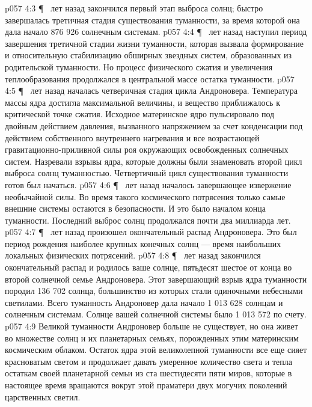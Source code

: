 \vs p057 4:3 \P\  лет назад закончился первый этап выброса солнц; быстро завершалась третичная стадия существования туманности, за время которой она дала начало 876 926 солнечным системам.
\vs p057 4:4 \P\  лет назад наступил период завершения третичной стадии жизни туманности, которая вызвала формирование и относительную стабилизацию обширных звездных систем, образованных из родительской туманности. Но процесс физического сжатия и увеличения теплообразования продолжался в центральной массе остатка туманности.
\vs p057 4:5 \P\  лет назад началась четверичная стадия цикла Андроновера. Температура массы ядра достигла максимальной величины, и вещество приближалось к критической точке сжатия. Исходное материнское ядро пульсировало под двойным действием давления, вызванного напряжением за счет конденсации под действием собственного внутреннего нагревания и все возрастающей гравитационно\hyp{}приливной силы роя окружающих освобожденных солнечных систем. Назревали взрывы ядра, которые должны были знаменовать второй цикл выброса солнц туманностью. Четвертичный цикл существования туманности готов был начаться.
\vs p057 4:6 \P\  лет назад началось завершающее извержение необычайной силы. Во время такого космического потрясения только самые внешние системы остаются в безопасности. И это было началом конца туманности. Последний выброс солнц продолжался почти два миллиарда лет.
\vs p057 4:7 \P\  лет назад произошел окончательный распад Андроновера. Это был период рождения наиболее крупных конечных солнц --- время наибольших локальных физических потрясений.
\vs p057 4:8 \P\  лет назад закончился окончательный распад и родилось ваше солнце, пятьдесят шестое от конца во второй солнечной семье Андроновера. Этот завершающий взрыв ядра туманности породил 136 702 солнца, большинство из которых стали одиночными небесными светилами. Всего туманность Андроновер дала начало 1 013 628 солнцам и солнечным системам. Солнце вашей солнечной системы было 1 013 572 по счету.
\vs p057 4:9 Великой туманности Андроновер больше не существует, но она живет во множестве солнц и их планетарных семьях, порожденных этим материнским космическим облаком. Остаток ядра этой великолепной туманности все еще сияет красноватым светом и продолжает давать умеренное количество света и тепла остаткам своей планетарной семьи из ста шестидесяти пяти миров, которые в настоящее время вращаются вокруг этой праматери двух могучих поколений царственных светил.
